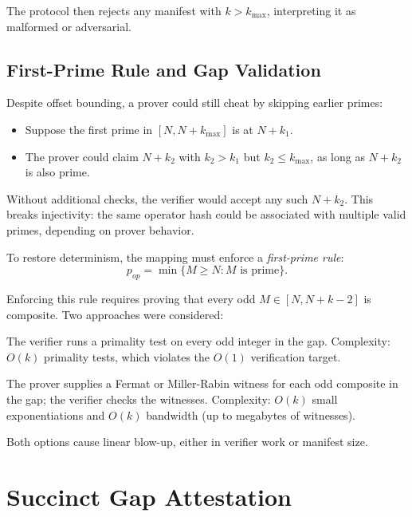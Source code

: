\documentclass[11pt]{article}
\begin{document}
The protocol then rejects any manifest with \( k > k_{\max} \), interpreting it as malformed or adversarial.

\subsection{First-Prime Rule and Gap Validation}

Despite offset bounding, a prover could still cheat by skipping earlier primes:

\begin{itemize}[leftmargin=*]
  \item Suppose the first prime in \( [N, N + k_{\max}] \) is at \( N + k_1 \).
  \item The prover could claim \( N + k_2 \) with \( k_2 > k_1 \) but \( k_2 \le k_{\max} \), as long as \( N + k_2 \) is also prime.
\end{itemize}

Without additional checks, the verifier would accept any such \( N+k_2 \). This breaks injectivity: the same operator hash could be associated with multiple valid primes, depending on prover behavior.

To restore determinism, the mapping must enforce a \emph{first-prime rule}:
\[
  p_{op} = \min\{ M \ge N : M \text{ is prime} \}.
\]

Enforcing this rule requires proving that every odd \( M \in [N, N+k-2] \) is composite. Two approaches were considered:

\begin{description}[leftmargin=*]
  \item[Option A (Verifier Gap Audit)] The verifier runs a primality test on every odd integer in the gap. Complexity: \( O(k) \) primality tests, which violates the \( O(1) \) verification target.
  \item[Option B (Explicit Witness Array)] The prover supplies a Fermat or Miller-Rabin witness for each odd composite in the gap; the verifier checks the witnesses. Complexity: \( O(k) \) small exponentiations and \( O(k) \) bandwidth (up to megabytes of witnesses).
\end{description}

Both options cause linear blow-up, either in verifier work or manifest size.

\section{Succinct Gap Attestation}
\end{document}
